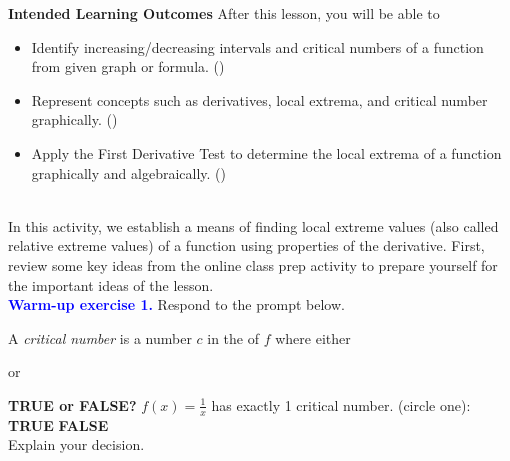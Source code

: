 \documentclass[10pt]{article}
\begin{document}
\pagestyle{otherpages}
\thispagestyle{firstpage}

\textbf{Intended Learning Outcomes}
After this lesson, you will be able to 

\begin{itemize}
    \item Identify increasing/decreasing intervals and critical numbers of a function from given graph or formula. ()
    \item Represent concepts such as derivatives, local extrema, and critical number graphically. ()
    \item Apply the First Derivative Test to determine the local extrema of a function graphically and algebraically. ()
\end{itemize}

\vspace{-0.5cm}

\hrulefill\\
In this activity, we establish a means of finding local extreme values (also called relative extreme values) of a function using properties of the derivative. First, review some key ideas from the online class prep activity to prepare yourself for the important ideas of the lesson.\\

{\bf \textcolor{blue}{Warm-up exercise 1.}}  Respond to the prompt below.
%
    {
    A {\em critical number} is  a number $c$ in the  of $f$ where either
  \begin{center}  \quad\quad\quad or \quad\quad\quad {} \end{center}
    }
    
    {\bf TRUE or FALSE?} $\displaystyle f(x)=\frac1x$ has exactly 1 critical number. \hfill (circle one): \hfill {\bf TRUE} \hfill {\bf FALSE}\\ Explain your decision.
    
 
\end{document}
